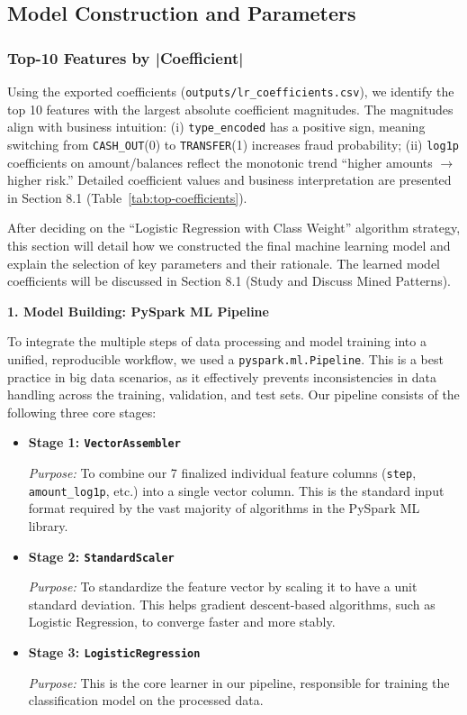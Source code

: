 \documentclass[sigplan,screen]{acmart}
\begin{document}
\subsection{Model Construction and Parameters}

\subsubsection{Top-10 Features by |Coefficient|}
Using the exported coefficients (\texttt{outputs/lr\_coefficients.csv}), we identify the top 10 features with the largest absolute coefficient magnitudes. The magnitudes align with business intuition: (i) \texttt{type\_encoded} has a positive sign, meaning switching from \texttt{CASH\_OUT}(0) to \texttt{TRANSFER}(1) increases fraud probability; (ii) \texttt{log1p} coefficients on amount/balances reflect the monotonic trend ``higher amounts \texorpdfstring{$\rightarrow$}{->} higher risk.'' Detailed coefficient values and business interpretation are presented in Section 8.1 (Table~\ref{tab:top-coefficients}).

After deciding on the ``Logistic Regression with Class Weight'' algorithm strategy, this section will detail how we constructed the final machine learning model and explain the selection of key parameters and their rationale. The learned model coefficients will be discussed in Section 8.1 (Study and Discuss Mined Patterns).

\textbf{1. Model Building: PySpark ML Pipeline}

To integrate the multiple steps of data processing and model training into a unified, reproducible workflow, we used a \texttt{pyspark.ml.Pipeline}. This is a best practice in big data scenarios, as it effectively prevents inconsistencies in data handling across the training, validation, and test sets. Our pipeline consists of the following three core stages:

\begin{itemize}
\item \textbf{Stage 1: \texttt{VectorAssembler}}

\textit{Purpose:} To combine our 7 finalized individual feature columns (\texttt{step}, \texttt{amount\_log1p}, etc.) into a single vector column. This is the standard input format required by the vast majority of algorithms in the PySpark ML library.

\item \textbf{Stage 2: \texttt{StandardScaler}}

\textit{Purpose:} To standardize the feature vector by scaling it to have a unit standard deviation. This helps gradient descent-based algorithms, such as Logistic Regression, to converge faster and more stably.

\item \textbf{Stage 3: \texttt{LogisticRegression}}

\textit{Purpose:} This is the core learner in our pipeline, responsible for training the classification model on the processed data.
\end{itemize}
\end{document}
